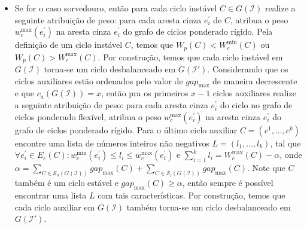 \begin{itemize}
\begin{itemize}
    \item Se for o caso sorvedouro, então para cada ciclo instável $C \in G(\mathcal{I})$ realize a seguinte atribuição de peso: para cada aresta cinza $e^{\prime}_i$ de $C$, atribua o peso $w^{\max}_c(e^{\prime}_i)$ na aresta cinza $e^{\prime}_i$ do grafo de ciclos ponderado rígido. Pela definição de um ciclo instável $C$, temos que $W_p(C)  < W^{\min}_c(C)$ ou $W_p(C) > W^{\max}_c(C)$. Por construção, temos que cada ciclo instável em $G(\mathcal{I})$ torna-se um ciclo desbalanceado em $G(\mathcal{I}')$. Considerando que os ciclos auxiliares estão ordenados pelo valor de $gap_{\max}$ de maneira decrescente e que $c_a(G(\mathcal{I})) = x$, então pra os primeiros $x-1$ ciclos auxiliares realize a seguinte atribuição de peso: para cada aresta cinza $e^{\prime}_i$ do ciclo no grafo de ciclos ponderado flexível, atribua o peso $w^{\max}_c(e^{\prime}_i)$ na aresta cinza $e^{\prime}_i$ do grafo de ciclos ponderado rígido. Para o último ciclo auxiliar $C=(c^1,\dots,c^k)$ encontre uma lista de números inteiros não negativos $L=(l_1,\dots,l_k)$, tal que $\forall e^{\prime}_i \in E_c(C): w^{\min}_c(e^{\prime}_i) \le l_i \le w^{\max}_c(e^{\prime}_i)$ e $\sum_{i=1}^{k}l_i = W^{\max}_c(C) - \alpha$, onde $\alpha = \sum_{C \in \mathcal{S}_a(G(\mathcal{I}))} gap_{\max}(C) + \sum_{C \in \mathcal{S}_i(G(\mathcal{I}))} gap_{\max}(C)$. Note que $C$ também é um ciclo estável e $gap_{\max}(C) \ge \alpha$, então sempre é possível encontrar uma lista $L$ com tais características. Por construção, temos que cada ciclo auxiliar em $G(\mathcal{I})$ também torna-se um ciclo desbalanceado em $G(\mathcal{I}')$.


\end{itemize}
\end{itemize}

